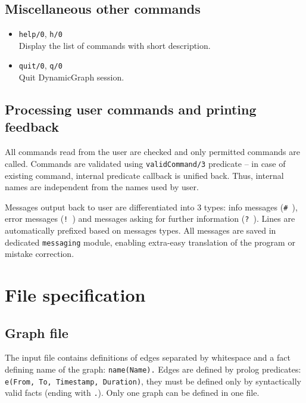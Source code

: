 \documentclass[11pt, a4paper]{article}
\newcommand{\pl}[1]{\texttt{#1}} %
\theoremstyle{plain}
\theoremstyle{definition}
\theoremstyle{remark}
\begin{document}
\subsection{Miscellaneous other commands}

\begin{itemize}
\item \pl{help/0}, \pl{h/0} \\
Display the list of commands with short description.

\item \pl{quit/0}, \pl{q/0} \\
Quit DynamicGraph session.
\end{itemize}

\subsection{Processing user commands and printing feedback}

All commands read from the user are checked and only permitted commands are called.
Commands are validated using \pl{validCommand/3} predicate -- in case of existing command,
internal predicate callback is unified back. Thus, internal names are independent from the names used by user.

Messages output back to user are differentiated into 3 types: info messages (\pl{\# }), error messages (\pl{! }) and 
messages asking for further information (\pl{? }). Lines are automatically prefixed based on messages types.
All messages are saved in dedicated \pl{messaging} module,
enabling extra-easy translation of the program or mistake correction.

\section{File specification}
\label{sec:files}

\subsection{Graph file}
\label{sec:files-graph}

The input file contains definitions of edges separated by whitespace
and a fact defining name of the graph: \pl{name(Name).}
Edges are defined by prolog predicates: \pl{e(From, To, Timestamp, Duration)},
they must be defined only by syntactically valid facts (ending with \pl{.}).
Only one graph can be defined in one file.
\end{document}
